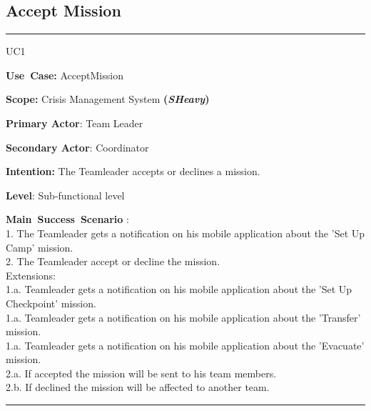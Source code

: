 \subsection{Accept Mission}
\vspace{0.5cm}
\hrule
\vspace{0.5cm}
\begin{lyxlist}{UC1}
\small{
\item [\textbf{Use~Case:}] AcceptMission
\item [\textbf{Scope:}] Crisis Management System \textbf{(\emph{SHeavy})}
\item [\textbf{Primary Actor}:] Team Leader
\item [\textbf{Secondary Actor}:] Coordinator
\item [\textbf{Intention:}]The Teamleader accepts or declines a mission.
\item [\textbf{Level}:]Sub-functional level
\item [\textbf{Main~Success~Scenario}]:\\
1. The Teamleader gets a notification on his mobile application about the
'Set Up Camp' mission.\\
2. The Teamleader accept or decline the mission.\\
Extensions:\\
	1.a.  Teamleader gets a notification on his mobile application about the
'Set Up Checkpoint' mission.\\
	1.a.  Teamleader gets a notification on his mobile application about the
'Transfer' mission.\\
	1.a.  Teamleader gets a notification on his mobile application about the
'Evacuate' mission.\\
	2.a. If accepted the mission will be sent to his team members.\\
	2.b. If declined the mission will be affected to another team.\\ 
}
\end{lyxlist}
\hrule 
\vspace{0.5cm} 

